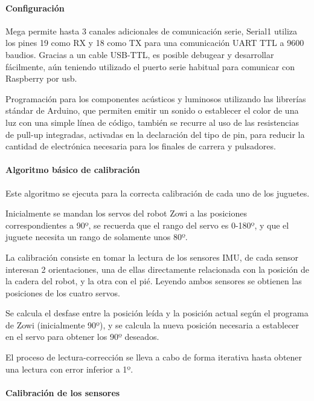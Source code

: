 \paragraph{Configuración}

Mega permite hasta 3 canales adicionales de comunicación serie, Serial1 utiliza los pines 19 como RX y 18 como TX para una comunicación UART TTL a 9600 baudios. Gracias a un cable USB-TTL, es posible debugear y desarrollar fácilmente, aún teniendo utilizado el puerto serie habitual para comunicar con Raspberry por usb.

Programación para los componentes acústicos y luminosos utilizando las librerías stándar de Arduino, que permiten emitir un sonido o establecer el color de una luz con una simple línea de código, también se recurre al uso de las resistencias de pull-up integradas, activadas en la declaración del tipo de pin, para reducir la cantidad de electrónica necesaria para los finales de carrera y pulsadores.

\paragraph{Algoritmo básico de calibración}

Este algoritmo se ejecuta para la correcta calibración de cada uno de los juguetes.

Inicialmente se mandan los servos del robot Zowi a las posiciones correspondientes a 90º, se recuerda que el rango del servo es 0-180º, y que el juguete necesita un rango de solamente unos 80º.

La calibración consiste en tomar la lectura de los sensores IMU, de cada sensor interesan 2 orientaciones, una de ellas directamente relacionada con la posición de la cadera del robot, y la otra con el pié. Leyendo ambos sensores se obtienen las posiciones de los cuatro servos.

Se calcula el desfase entre la posición leída y la posición actual según el programa de Zowi (inicialmente 90º), y se calcula la nueva posición necesaria a establecer en el servo para obtener los 90º deseados.

El proceso de lectura-corrección se lleva a cabo de forma iterativa hasta obtener una lectura con error inferior a 1º.

\paragraph{Calibración de los sensores}

